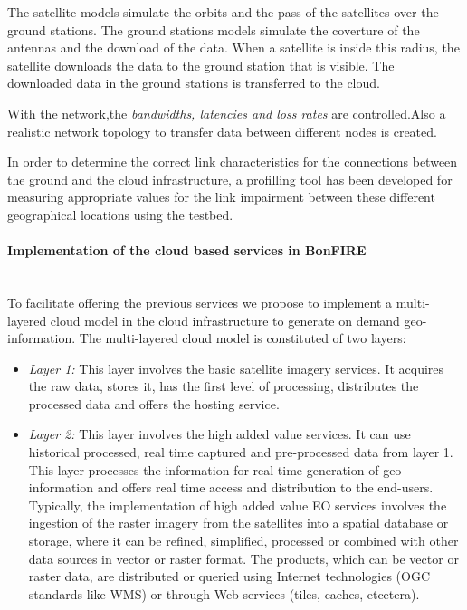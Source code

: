 The satellite models simulate the orbits and the pass of the satellites over the ground stations. The ground stations models simulate the coverture of the antennas and the download of the data. When a satellite is inside this radius, the satellite downloads the data to the ground station that is visible. The downloaded data in the ground stations is transferred to the \bonfire cloud.

With the \vw network,the \emph{bandwidths, latencies and loss rates} are
controlled.Also a realistic network topology to transfer data between different
nodes is created.

In order to determine the correct link characteristics for the connections
between the ground and the cloud infrastructure, a profilling tool has been
developed for measuring appropriate values for the link impairment between these different geographical locations using the \pl testbed.


\paragraph{Implementation of the cloud based services in BonFIRE}~\\
To facilitate offering the previous services we propose to implement a multi-layered cloud model in the \bonfire cloud infrastructure to generate on demand geo-information. The multi-layered cloud model is constituted of two layers:
\begin{itemize}
\item \emph{Layer 1:} This layer involves the basic satellite imagery services.  It acquires the raw data, stores it, has the first level of processing, distributes the processed data and offers the hosting service.

\item \emph{Layer 2:} This layer involves the high added value services. It can use historical processed, real time captured and pre-processed data from layer 1. This layer processes the information for real time generation of geo-information and offers real time access and distribution to the end-users. Typically, the implementation of high added value EO services involves the ingestion of the raster imagery from the satellites into a spatial database or storage, where it can be refined, simplified, processed or combined with other data sources in vector or raster format. The products, which can be vector or raster data, are distributed or queried using Internet technologies (OGC standards like WMS) or through Web services (tiles, caches, etcetera).
\end{itemize}

